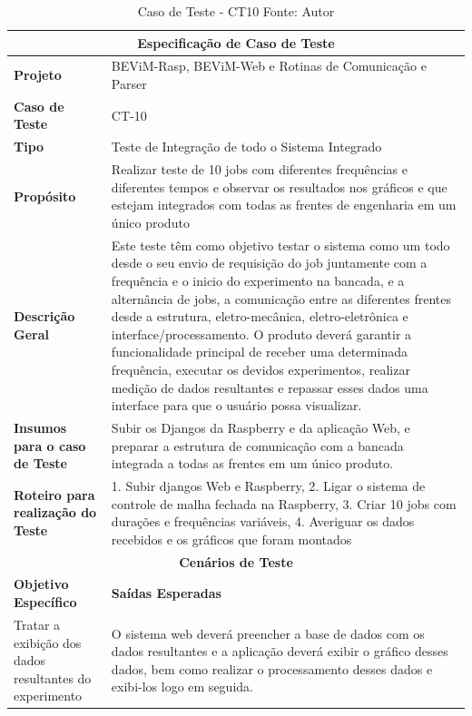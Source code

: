 \begin{table}[H]
    \begin{center}
        \begin{tabular}{|p{5cm}|p{12cm}|}
            \hline
            \multicolumn{2}{|c|}{\textbf{Especificação de Caso de Teste}} \\ \hline
                \textbf{Projeto}                                        & BEViM-Rasp, BEViM-Web e Rotinas de Comunicação e Parser\\ \hline
                \textbf{Caso de Teste}                             & CT-10 \\ \hline
                \textbf{Tipo}                                             & Teste de Integração de todo o Sistema Integrado \\ \hline
                \textbf{Propósito}                                     & Realizar teste de 10 jobs com diferentes frequências e diferentes tempos e observar os resultados nos gráficos e que estejam integrados com todas as frentes de engenharia em um único produto \\ \hline
                \textbf{Descrição Geral}                           & Este teste têm como objetivo testar o sistema como um todo desde o seu envio de requisição do job juntamente com a frequência e o inicio do experimento na bancada, e a alternância de jobs, a comunicação entre as diferentes frentes desde a estrutura, eletro-mecânica, eletro-eletrônica e interface/processamento. O produto deverá garantir a funcionalidade principal de receber uma determinada frequência, executar os devidos experimentos, realizar medição de dados resultantes e repassar esses dados uma interface para que o usuário possa visualizar. \\ \hline
                \textbf{Insumos para o caso de Teste}    & Subir os Djangos da Raspberry e da aplicação Web, e preparar a estrutura de comunicação com a bancada integrada a todas as frentes em um único produto. \\ \hline
                \textbf{Roteiro para realização do Teste}&  1. Subir djangos Web e Raspberry, 2. Ligar o sistema de controle de malha fechada na Raspberry, 3. Criar 10 jobs com durações e frequências variáveis,  4. Averiguar os dados recebidos e os gráficos que foram montados  \\ \hline
            \multicolumn{2}{|c|}{\textbf{Cenários de Teste}} \\ \hline
                \textbf{Objetivo Específico}                      & \textbf{Saídas Esperadas} \\ \hline
                Tratar a exibição dos dados resultantes do experimento & O sistema web deverá preencher a base de dados com os dados resultantes e a aplicação deverá exibir o gráfico desses dados, bem como realizar o processamento desses dados e exibi-los logo em seguida. \\ \hline
        \end{tabular}
    \end{center}
    \caption[Caso de Teste - CT10]{Caso de Teste - CT10
    \protect Fonte: Autor}
    \label{CT-10}
\end{table}

